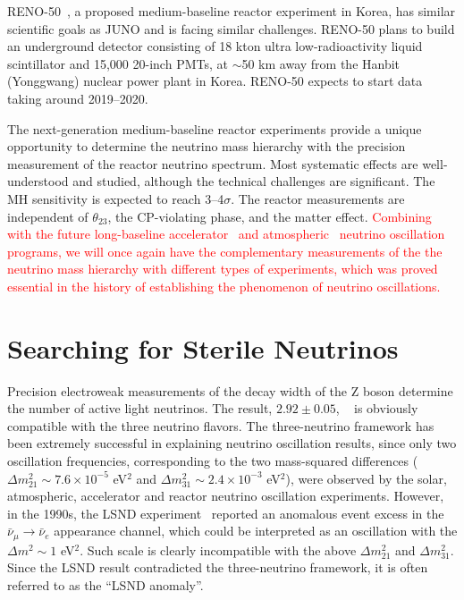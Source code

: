 \documentclass[aps,twocolumn,preprintnumbers,amsmath,superscriptaddress,amssymb,floats,nofootinbib]{revtex4-1}
\begin{document}
RENO-50~\cite{RENO-50}, a proposed medium-baseline reactor experiment in Korea, has similar scientific goals as JUNO and is facing similar challenges. RENO-50 plans to build an underground detector consisting of 18 kton ultra low-radioactivity liquid scintillator and 15,000 20-inch PMTs, at $\sim$50 km away from the Hanbit (Yonggwang) nuclear power plant in Korea. RENO-50 expects to start data taking around 2019--2020.

The next-generation medium-baseline reactor experiments provide a unique opportunity to determine the neutrino mass hierarchy with the precision measurement of the reactor neutrino spectrum.
Most systematic effects are well-understood and studied, although the technical challenges are significant. 
The MH sensitivity is expected to reach 3--4$\sigma$.
The reactor measurements are independent of $\theta_{23}$, the CP-violating phase, and the matter effect.
\textcolor{red}{Combining with the future long-baseline accelerator~\cite{LBNE} and atmospheric~\cite{PINGU,ORCA} neutrino oscillation programs, we will once again have the complementary measurements of the the neutrino mass hierarchy with different types of experiments, which was proved essential in the history of establishing the phenomenon of neutrino oscillations.}


\section{Searching for Sterile Neutrinos}

Precision electroweak measurements of the decay width of the Z boson
determine the number of active light neutrinos. The result, $2.92 \pm 0.05$,  ~\cite{EW-2005} is obviously compatible with the three neutrino flavors.
The three-neutrino framework has been extremely successful in explaining neutrino oscillation results, since only two oscillation frequencies, corresponding to the two mass-squared differences 
($\Delta m_{21}^2\sim7.6\times10^{-5}$ eV$^2$ and $\Delta m_{31}^2 \sim2.4\times10^{-3}$ eV$^2$), 
were observed by the solar, atmospheric, accelerator and reactor neutrino oscillation experiments. 
However, in the 1990s, the LSND experiment~\cite{LSND1995,LSND2001} reported an anomalous 
event excess in the $\bar\nu_\mu\rightarrow\bar\nu_e$ appearance channel, which could be interpreted as an oscillation with the $\Delta m^2\sim1$ eV$^2$.
Such scale is clearly incompatible with the above $\Delta m_{21}^2$ and $\Delta m_{31}^2$.
Since the LSND result contradicted the three-neutrino framework, it is often referred to as the ``LSND anomaly''.
\end{document}
